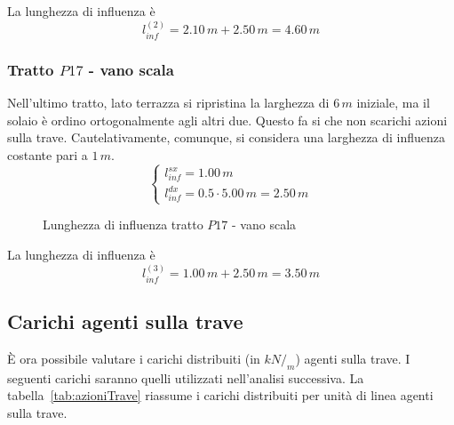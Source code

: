 La lunghezza di influenza è
\[
	l_{inf}^{(2)} = 2.10\,m + 2.50\,m = 4.60\,m
\]

\subsubsection*{Tratto $P17$ -  vano scala}
Nell'ultimo tratto, lato terrazza si ripristina la larghezza di $6\,m$ iniziale, ma il solaio è ordino ortogonalmente agli altri due. Questo fa si che non scarichi azioni sulla trave. Cautelativamente, comunque, si considera una larghezza di influenza costante pari a $1\,m$.
\begin{equation*}
	\begin{cases}
		l_{inf}^{sx} = 1.00\,m\\
		l_{inf}^{dx} = 0.5\cdot 5.00\,m = 2.50\,m
	\end{cases}
\end{equation*}

\begin{figure}
	\centering
	\caption{Lunghezza di influenza tratto $P17$ - vano scala}
	\label{fig:infLength_3}
\end{figure}

La lunghezza di influenza è
\[
	l_{inf}^{(3)} = 1.00\,m + 2.50\,m = 3.50\,m
\]

\subsection{Carichi agenti sulla trave}
È ora possibile valutare i carichi distribuiti (in $kN/_m$) agenti sulla trave. I seguenti carichi saranno quelli utilizzati nell'analisi successiva. La tabella~\ref{tab:azioniTrave} riassume i carichi distribuiti per unità di linea agenti sulla trave.

